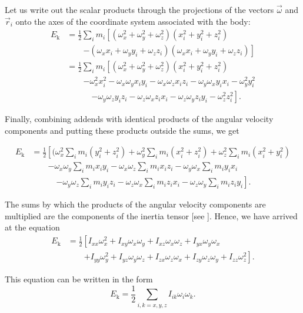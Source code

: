 \noindent
Let us write out the scalar products through the projections of the vectors $\vec{\omega}$ and $\vec{r}_i$ onto the axes of the coordinate system associated with the body:
\begin{align*}
	E_{\text{k}} &= \frac{1}{2}\sum_i m_i \left[(\omega_x^2+\omega_y^2+\omega_z^2)(x_i^2+y_i^2+z_i^2) \right.\\
	&\quad\quad\left. - (\omega_x x_i+\omega_y y_i+\omega_z z_i)(\omega_x x_i+\omega_y y_i+\omega_z z_i)\right]\\
	&= \frac{1}{2}\sum_i m_i \left[(\omega_x^2+\omega_y^2+\omega_z^2)(x_i^2+y_i^2+z_i^2)  \right.\\
	&\quad\quad\left. -\omega_x^2x_i^2 - \omega_x\omega_yx_iy_i - \omega_x\omega_zx_iz_i - \omega_y\omega_xy_ix_i - \omega_y^2y_i^2   \right.\\
	&\quad\quad\quad\left. - \omega_y\omega_zy_iz_i - \omega_z\omega_xz_ix_i - \omega_z\omega_yz_iy_i - \omega_z^2z_i^2\right].
\end{align*}

\noindent
Finally, combining addends with identical products of the angular velocity components and putting these products outside the sums, we get

\begin{align*}
	E_{\text{k}} &= \frac{1}{2}\left[(\omega_x^2 \sum_i m_i (y_i^2+z_i^2) + \omega_y^2 \sum_i m_i (x_i^2+z_i^2) + \omega_z^2 \sum_i m_i (x_i^2+y_i^2) \right.\\
	&\quad\quad\left. - \omega_x\omega_y \sum_i m_ix_iy_i - \omega_x\omega_z \sum_i m_i x_iz_i - \omega_y\omega_x \sum_i m_i y_ix_i \right.\\
	&\quad\quad\quad\left. -\omega_y\omega_z \sum_i m_i y_iz_i - \omega_z\omega_x \sum_i m_i z_ix_i - \omega_z\omega_y \sum_i m_i z_iy_i\right].
\end{align*}

The sums by which the products of the angular velocity components are multiplied are the components of the inertia tensor [see ]. Hence, we have arrived at the equation
\begin{align}
	E_{\text{k}} &= \frac{1}{2}\left[I_{xx}\omega_x^2 + I_{xy}\omega_x\omega_y + I_{xz}\omega_x\omega_z + I_{yx}\omega_y\omega_x \right.\nonumber\\
	&\quad\quad\left. + I_{yy}\omega_y^2 + I_{yz}\omega_y\omega_z + I_{zx}\omega_z\omega_x + I_{zy}\omega_z\omega_y + I_{zz}\omega_z^2\right].\label{eq:5_50}
\end{align}

\noindent
This equation can be written in the form
\begin{equation}\label{eq:5_51}
	E_{\text{k}} = \frac{1}{2}\sum_{i,k=x,y,z} I_{ik}\omega_i\omega_k.
\end{equation}

